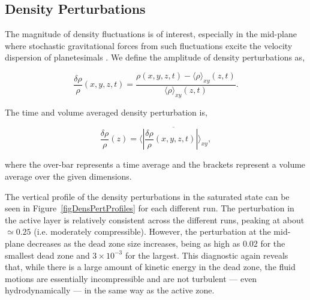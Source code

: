 \begin{table*}
\centering
{}
\caption{Summary of time and volume averaged values in the steady state.}
\label{tabResults}
\end{table*}


\subsection{Density Perturbations}
The magnitude of density fluctuations is of interest, especially in the mid-plane where stochastic 
gravitational forces from such fluctuations excite the velocity dispersion of planetesimals 
\citep{ida08,gressel11,okuzumi13}. We define the amplitude of density perturbations as,

\begin{equation}
\frac{\delta\rho}{\rho}(x,y,z,t) = \frac{\rho(x,y,z,t)-\langle \rho \rangle_{xy}(z,t)}{\langle \rho \rangle_{xy}(z,t)}.                  
\end{equation}

\noindent The time and volume averaged density perturbation is,

\begin{equation}
\frac{\delta\rho}{\rho}(z) = \overline{\langle |\frac{\delta\rho}{\rho}(x,y,z,t)|\rangle_{xy}},                  
\end{equation}

\noindent where the over-bar represents a time average and the brackets represent a volume average over the given dimensions.

The vertical profile of the density perturbations in the saturated state can be seen in Figure~\ref{figDensPertProfiles} for each different run.  The perturbation in the active layer is relatively consistent across the different runs, peaking at about $\simeq 0.25$ (i.e. moderately compressible).  However, the perturbation at the mid-plane decreases as the dead zone size increases, being as high as 0.02 for the smallest dead zone and $3 \times 10^{-3}$ for the largest.  This diagnostic again reveals that, while there is a large amount of kinetic energy in the dead zone, the fluid motions are essentially incompressible and are not turbulent --- even hydrodynamically --- in the same way as the active zone.

